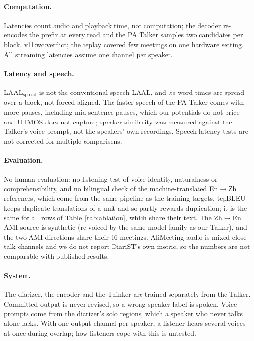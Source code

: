 \paragraph{Computation.} Latencies count audio and playback time, not computation; the decoder re-encodes the prefix
at every read and the PA Talker samples two candidates per block.\ifWallclock{} \num{v11:wc:verdict}; the replay
covered few meetings on one hardware setting.\fi{} All streaming latencies assume one channel per speaker.

\paragraph{Latency and speech.} LAAL$_\text{spread}$ is not the conventional speech LAAL, and its word times are spread
over a block, not forced-aligned. The faster speech of the PA Talker comes with more pauses, including mid-sentence
pauses, which our potentials do not price and UTMOS does not capture; speaker similarity was measured against the
Talker's voice prompt, not the speakers' own recordings. Speech-latency tests are not corrected for multiple
comparisons.

\paragraph{Evaluation.} No human evaluation: no listening test of voice identity, naturalness or comprehensibility,
and no bilingual check of the machine-translated En$\rightarrow$Zh references, which come from the same pipeline as the
training targets. tcpBLEU keeps duplicate translations of a unit and so partly rewards duplication; it is the same for
all rows of Table~\ref{tab:ablation}, which share their text. The Zh$\rightarrow$En AMI source is synthetic (re-voiced by
the same model family as our Talker), and the two AMI directions share their 16 meetings. AliMeeting audio is mixed
close-talk channels and we do not report DiariST's own metric, so the numbers are not comparable with published
results.

\paragraph{System.} The diarizer, the encoder and the Thinker are trained separately from the Talker. Committed output
is never revised, so a wrong speaker label is spoken. Voice prompts come from the diarizer's solo regions, which a
speaker who never talks alone lacks. With one output channel per speaker, a listener hears several voices at once
during overlap; how listeners cope with this is untested.

